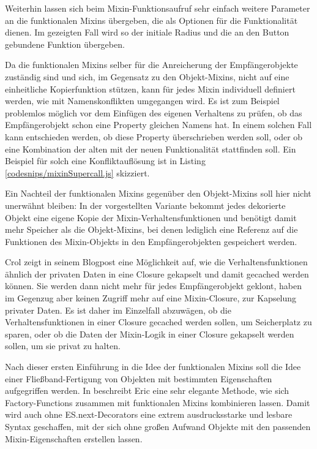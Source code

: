 Weiterhin lassen sich beim Mixin-Funktionsaufruf sehr einfach weitere Parameter an die funktionalen Mixins übergeben, die als Optionen für die Funktionalität dienen. Im gezeigten Fall wird so der initiale Radius und die an den Button gebundene Funktion übergeben. 

Da die funktionalen Mixins selber für die Anreicherung der Empfängerobjekte zuständig sind und sich, im Gegensatz zu den Objekt-Mixins, nicht auf eine einheitliche Kopierfunktion stützen, kann für jedes Mixin individuell definiert werden, wie mit Namenskonflikten umgegangen wird. Es ist zum Beispiel problemlos möglich vor dem Einfügen des eigenen Verhaltens zu prüfen, ob das Empfängerobjekt schon eine Property gleichen Namens hat. In einem solchen Fall kann entschieden werden, ob diese Property überschrieben werden soll, oder ob eine Kombination der alten mit der neuen Funktionalität stattfinden soll. Ein Beispiel für solch eine Konfliktauflösung ist in Listing \ref{codesnips/mixinSupercall.js} skizziert.


Ein Nachteil der funktionalen Mixins gegenüber den Objekt-Mixins soll hier nicht unerwähnt bleiben: In der vorgestellten Variante bekommt jedes dekorierte Objekt eine eigene Kopie der Mixin-Verhaltensfunktionen und benötigt damit mehr Speicher als die Objekt-Mixins, bei denen lediglich eine Referenz auf die Funktionen des Mixin-Objekts in den Empfängerobjekten gespeichert werden. 

Crol zeigt in seinem Blogpost eine Möglichkeit auf, wie die Verhaltensfunktionen ähnlich der privaten Daten in eine Closure gekapselt und damit gecached werden können. Sie werden dann nicht mehr für jedes Empfängerobjekt geklont, haben im Gegenzug aber keinen Zugriff mehr auf eine Mixin-Closure, zur Kapselung privater Daten. Es ist daher im Einzelfall abzuwägen, ob die Verhaltensfunktionen in einer Closure gecached werden sollen, um Seicherplatz zu sparen, oder ob die Daten der Mixin-Logik in einer Closure gekapselt werden sollen, um sie privat zu halten.

\skippingparagraph
Nach dieser ersten Einführung in die Idee der funktionalen Mixins soll die Idee einer Fließband-Fertigung von Objekten mit bestimmten Eigenschaften aufgegriffen werden. In \citep{ElliottJavaScriptFactoryFunctions2017} beschreibt Eric eine sehr elegante Methode, wie sich Factory-Functions zusammen mit funktionalen Mixins kombinieren lassen. Damit wird auch ohne ES.next-Decorators eine extrem ausdrucksstarke und lesbare Syntax geschaffen, mit der sich ohne großen Aufwand Objekte mit den passenden Mixin-Eigenschaften erstellen lassen.

